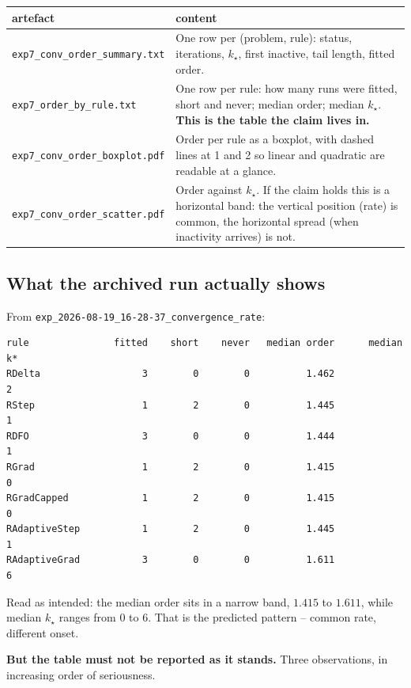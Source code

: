 \documentclass[11pt,a4paper]{article}
\newcommand{\file}[1]{\texttt{\small #1}}
\newcommand{\finding}[1]{\textcolor{Alert}{\textbf{#1}}}
\begin{document}
\begin{longtable}{@{}p{52mm}p{94mm}@{}}
\toprule
\textbf{artefact} & \textbf{content} \\
\midrule
\endhead
\file{exp7\_conv\_order\_summary.txt} &
One row per (problem, rule): status, iterations, $k_\star$, first inactive, tail
length, fitted order. \\[3pt]
\file{exp7\_order\_by\_rule.txt} &
One row per rule: how many runs were fitted, short and never; median order; median
$k_\star$. \textbf{This is the table the claim lives in.} \\[3pt]
\file{exp7\_conv\_order\_boxplot.pdf} &
Order per rule as a boxplot, with dashed lines at 1 and 2 so linear and quadratic
are readable at a glance. \\[3pt]
\file{exp7\_conv\_order\_scatter.pdf} &
Order against $k_\star$. If the claim holds this is a horizontal band: the vertical
position (rate) is common, the horizontal spread (when inactivity arrives) is not. \\
\bottomrule
\end{longtable}

\subsection{What the archived run actually shows}

From \file{exp\_2026-08-19\_16-28-37\_convergence\_rate}:

\begin{lstlisting}
rule               fitted    short    never   median order      median k*
RDelta                  3        0        0          1.462              2
RStep                   1        2        0          1.445              1
RDFO                    3        0        0          1.444              1
RGrad                   1        2        0          1.415              0
RGradCapped             1        2        0          1.415              0
RAdaptiveStep           1        2        0          1.445              1
RAdaptiveGrad           3        0        0          1.611              6
\end{lstlisting}

Read as intended: the median order sits in a narrow band, $1.415$ to $1.611$,
while median $k_\star$ ranges from $0$ to $6$. That is the predicted pattern --
common rate, different onset.

\finding{But the table must not be reported as it stands.} Three observations,
in increasing order of seriousness.
\end{document}
